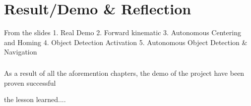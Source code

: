 \chapter{Result/Demo \& Reflection}

From the slides 
1. Real Demo 
2. Forward kinematic
3. Autonomous Centering and Homing 
4. Object Detection Activation
5. Autonomous Object Detection & Navigation

\paragraph*{}
As a result of all the aforemention chapters, the demo of the project have been proven successful

the lesson learned....